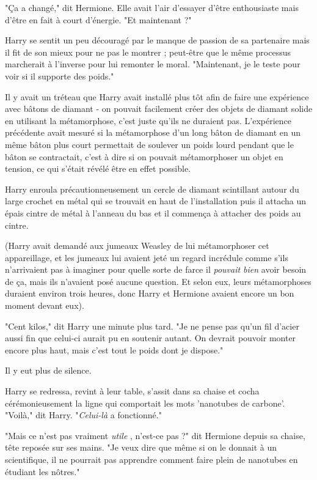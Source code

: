 "Ça a changé," dit Hermione. Elle avait l'air d'essayer d'être enthousiaste mais d'être en fait à court d'énergie. "Et maintenant ?"

Harry se sentit un peu découragé par le manque de passion de sa partenaire mais il fit de son mieux pour ne pas le montrer ; peut-être que le même processus marcherait à l'inverse pour lui remonter le moral. "Maintenant, je le teste pour voir si il supporte des poids."

Il y avait un tréteau que Harry avait installé plus tôt afin de faire une expérience avec bâtons de diamant - on pouvait facilement créer des objets de diamant solide en utilisant la métamorphose, c'est juste qu'ils ne duraient pas. L'expérience précédente avait mesuré si la métamorphose d'un long bâton de diamant en un même bâton plus court permettait de soulever un poids lourd pendant que le bâton se contractait, c'est à dire si on pouvait métamorphoser un objet en tension, ce qui s'était révélé être en effet possible.

Harry enroula précautionneusement un cercle de diamant scintillant autour du large crochet en métal qui se trouvait en haut de l'installation puis il attacha un épais cintre de métal à l'anneau du bas et il commença à attacher des poids au cintre.

(Harry avait demandé aux jumeaux Weasley de lui métamorphoser cet appareillage, et les jumeaux lui avaient jeté un regard incrédule comme s'ils n'arrivaient pas à imaginer pour quelle sorte de farce il \emph{pouvait bien}  avoir besoin de ça, mais ils n'avaient posé aucune question. Et selon eux, leurs métamorphoses duraient environ trois heures, donc Harry et Hermione avaient encore un bon moment devant eux).

"Cent kilos," dit Harry une minute plus tard. "Je ne pense pas qu'un fil d'acier aussi fin que celui-ci aurait pu en soutenir autant. On devrait pouvoir monter encore plus haut, mais c'est tout le poids dont je dispose."

Il y eut plus de silence.

Harry se redressa, revint à leur table, s'assit dans sa chaise et cocha cérémonieusement la ligne qui comportait les mots 'nanotubes de carbone'. "Voilà," dit Harry. "\emph{Celui-là}  a fonctionné."

"Mais ce n'est pas vraiment \emph{utile} , n'est-ce pas ?" dit Hermione depuis sa chaise, tête reposée sur ses mains. "Je veux dire que même si on le donnait à un scientifique, il ne pourrait pas apprendre comment faire plein de nanotubes en étudiant les nôtres."

